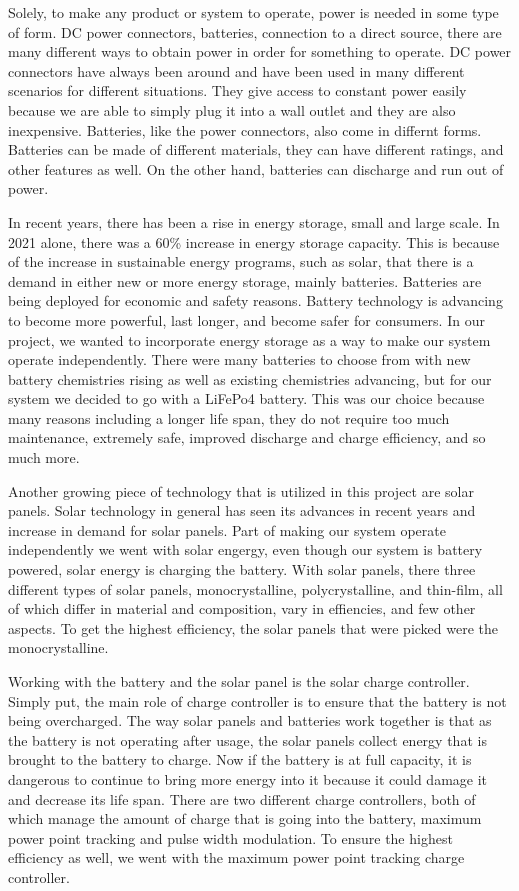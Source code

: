 \documentclass[journal]{IEEEtran}
\begin{document}
Solely, to make any product or system to operate, power is needed in some type of form. DC power 
connectors, batteries, connection to a direct source, there are many different ways to obtain power 
in order for something to operate. DC power connectors have always been around and have been used 
in many different scenarios for different situations. They give access to constant power easily 
because we are able to simply plug it into a wall outlet and they are also inexpensive. Batteries, 
like the power connectors, also come in differnt forms. Batteries can be made of different materials, 
they can have different ratings, and other features as well. On the other hand, batteries can discharge 
and run out of power. 

In recent years, there has been a rise in energy storage, small and large scale. In 2021 alone, there 
was a 60\% increase in energy storage capacity. This is because of the increase in sustainable energy 
programs, such as solar, that there is a demand in either new or more energy storage, mainly batteries. 
Batteries are being deployed for economic and safety reasons. Battery technology is advancing to become 
more powerful, last longer, and become safer for consumers. In our project, we wanted to incorporate 
energy storage as a way to make our system operate independently. There were many batteries to choose 
from with new battery chemistries rising as well as existing chemistries advancing, but for our system 
we decided to go with a LiFePo4 battery. This was our choice because many reasons including a longer 
life span, they do not require too much maintenance, extremely safe, improved discharge and charge 
efficiency, and so much more. 

Another growing piece of technology that is utilized in this project are solar panels. Solar technology 
in general has seen its advances in recent years and increase in demand for solar panels. Part of making 
our system operate independently we went with solar engergy, even though our system is battery powered, 
solar energy is charging the battery. With solar panels, there three different types of solar panels, 
monocrystalline, polycrystalline, and thin-film, all of which differ in material and composition, vary in 
effiencies, and few other aspects. To get the highest efficiency, the solar panels that were picked were 
the monocrystalline.

Working with the battery and the solar panel is the solar charge controller. Simply put, the main role of 
charge controller is to ensure that the battery is not being overcharged. The way solar panels and batteries 
work together is that as the battery is not operating after usage, the solar panels collect energy that 
is brought to the battery to charge. Now if the battery is at full capacity, it is dangerous to continue 
to bring more energy into it because it could damage it and decrease its life span. There are two different 
charge controllers, both of which manage the amount of charge that is going into the battery, maximum power 
point tracking and pulse width modulation. To ensure the highest efficiency as well, we went with the 
maximum power point tracking charge controller.
\end{document}
